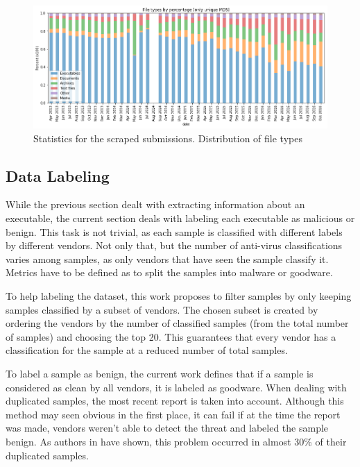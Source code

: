 \documentclass{llncs}
\begin{document}
\begin{figure}[!h]
	\includegraphics[width=\textwidth]{samples_types}
	\caption{Statistics for the scraped submissions. Distribution of file types}
	\label{fig:dist_submissions_types}
\end{figure}

\subsection{Data Labeling}\label{subsec:data_labeling}

While the previous section dealt with extracting information about an executable, the current section deals with labeling each executable as malicious or benign. This task is not trivial, as each sample is classified with different labels by different vendors. Not only that, but the number of anti-virus classifications varies among samples, as only vendors that have seen the sample classify it. Metrics have to be defined as to split the samples into malware or goodware.

To help labeling the dataset, this work proposes to filter samples by only keeping samples classified by a subset of vendors. The chosen subset is created by ordering the vendors by the number of classified samples (from the total number of samples) and choosing the top 20. This guarantees that every vendor has a classification for the sample at a reduced number of total samples.

To label a sample as benign, the current work defines that if a sample is considered as clean by all vendors, it is labeled as goodware. When dealing with duplicated samples, the most recent report is taken into account. Although this method may seen obvious in the first place, it can fail if at the time the report was made, vendors weren't able to detect the threat and labeled the sample benign. As authors in \cite{miller:rev_int} have shown, this problem occurred in almost 30\% of their duplicated samples.
\end{document}
